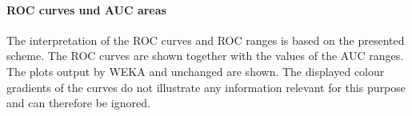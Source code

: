 \paragraph{ROC curves und AUC areas}

The interpretation of the ROC curves and ROC ranges is based on the presented scheme. The ROC curves are shown together with the values of the AUC ranges. The plots output by WEKA and unchanged are shown. The displayed colour gradients of the curves do not illustrate any information relevant for this purpose and can therefore be ignored.

\begin{figure}[t]
  \centering
  \qquad

\end{figure}
